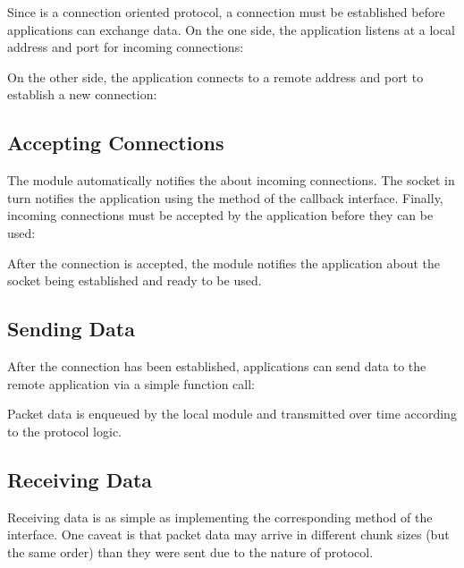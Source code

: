 Since  is a connection oriented protocol, a connection must be
established before applications can exchange data. On the one side, the
application listens at a local address and port for incoming 
connections:


On the other side, the application connects to a remote address and port to
establish a new connection:


\subsection*{Accepting Connections}

The  module automatically notifies the  about
incoming connections. The socket in turn notifies the application using the
 method of the callback interface. Finally,
incoming  connections must be accepted by the application before
they can be used:


After the connection is accepted, the  module notifies the
application about the socket being established and ready to be used.

\subsection*{Sending Data}

After the connection has been established, applications can send data to the
remote application via a simple function call:


Packet data is enqueued by the local  module and transmitted
over time according to the protocol logic.

\subsection*{Receiving Data}

Receiving data is as simple as implementing the corresponding method of the
 interface. One caveat is that packet data may
arrive in different chunk sizes (but the same order) than they were sent due to
the nature of  protocol.

